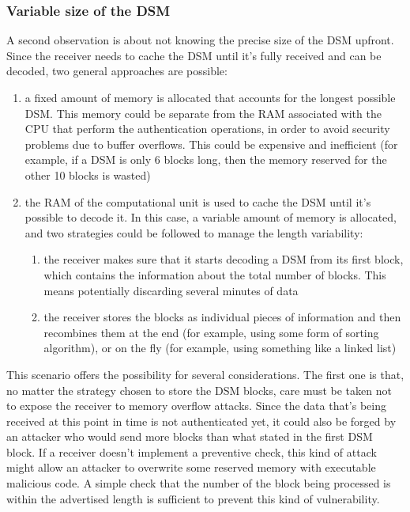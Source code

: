 \subsubsection{Variable size of the DSM}
A second observation is about not knowing the precise size of the DSM upfront.
Since the receiver needs to cache the DSM until it's fully received and can be
decoded, two general approaches are possible:
\begin{enumerate}
  \item a fixed amount of memory is allocated that accounts for the longest
    possible DSM. This memory could be separate from the RAM associated with the
    CPU that perform the authentication operations, in order to avoid security
    problems due to buffer overflows. This could be expensive and inefficient
    (for example, if a DSM is only 6 blocks long, then the memory reserved for
    the other 10 blocks is wasted)
  \item the RAM of the computational unit is used to cache the DSM until it's
    possible to decode it. In this case, a variable amount of memory is
    allocated, and two strategies could be followed to manage the length
    variability:
    \begin{enumerate}
      \item the receiver makes sure that it starts decoding a DSM from its first
        block, which contains the information about the total number of blocks.
        This means potentially discarding several minutes of data
      \item the receiver stores the blocks as individual pieces of information
        and then recombines them at the end (for example, using some form of
        sorting algorithm), or on the fly (for example, using something like a
        linked list)
    \end{enumerate}
\end{enumerate}

This scenario offers the possibility for several considerations. The first one
is that, no matter the strategy chosen to store the DSM blocks, care must be
taken not to expose the receiver to memory overflow attacks. Since the data
that's being received at this point in time is not authenticated yet, it could
also be forged by an attacker who would send more blocks than what stated
in the first DSM block. If a receiver doesn't implement a preventive check, this
kind of attack might allow an attacker to overwrite some reserved memory with
executable malicious code. A simple check that the number of the block being
processed is within the advertised length is sufficient to prevent this kind of
vulnerability.

